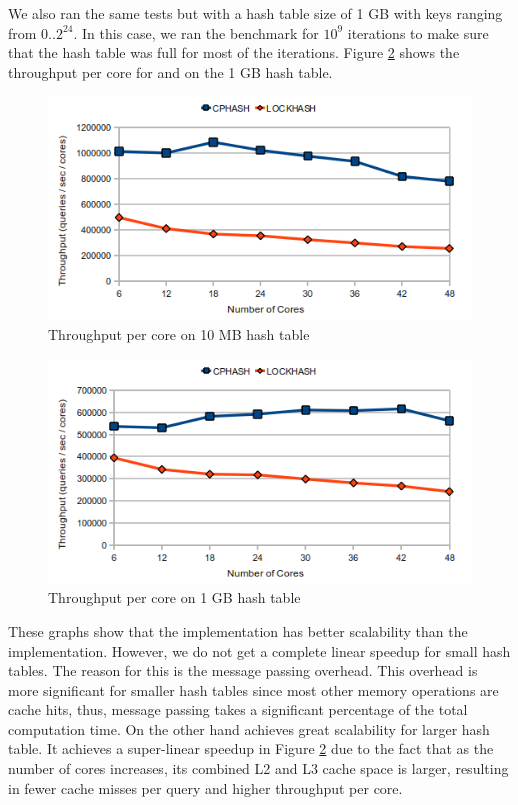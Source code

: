 We also ran the same tests but with a hash table size of 1 GB with keys ranging from 0..$2^{24}$. In this case, we ran the benchmark for $10^{9}$ iterations to make
sure that the hash table was full for most of the iterations. Figure \ref{fig:scale1gb} shows the throughput per core for \cphash{} and \lockhash{} on the
1 GB hash table.

\begin{figure}[!ht]
  \centering
  \includegraphics[width=\linewidth]{figs/scale10mb.png}
  \caption{Throughput per core on 10 MB hash table}
  \label{fig:scale10mb}
\end{figure}
    
\begin{figure}[!ht]
  \centering
  \includegraphics[width=\linewidth]{figs/scale1gb.png}
  \caption{Throughput per core on 1 GB hash table}
  \label{fig:scale1gb}
\end{figure}

These graphs show that the \cphash{} implementation has better scalability than the \lockhash{} implementation. However, we do not 
get a complete linear speedup for small hash tables. The reason for this is the message passing overhead. This overhead is more significant for smaller 
hash tables since most other memory operations are cache hits, thus, message passing takes a significant percentage of the total computation time. On
the other hand \cphash{} achieves great scalability for larger hash table. It achieves a super-linear speedup in Figure \ref{fig:scale1gb} due to the fact that
as the number of cores increases, its combined L2 and L3 cache space is larger, resulting in fewer cache misses per query and higher throughput per core. 

